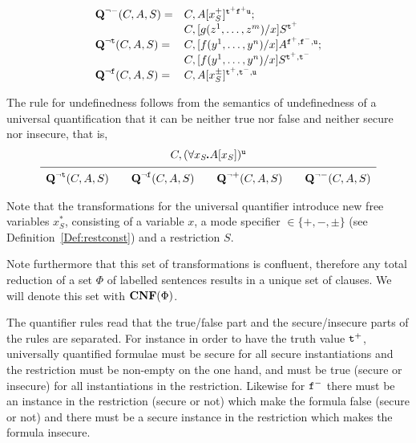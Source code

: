 \documentclass{\filespath jancl}
\def\Cnf{\hbox{\bf CNF}}               %
\def\sdot{\rule{.3ex}{.3ex}\hspace{-0.4ex}\;}
\newcommand{\true}{{\tt t}}
\newcommand{\false}{{\tt f}}
\newcommand{\twts}{{{\tt t}^+}}
\newcommand{\twfs}{{{\tt f}^+}}
\newcommand{\twti}{{{\tt t}^-}}
\newcommand{\twfi}{{{\tt f}^-}}
\newcommand{\twu}{{\tt u}}
\begin{document}
\begin{definition}
\[\begin{array}{ll}
\Q^{\non -}(C,A,S) = & C, A[x_S^+]^{\twts\twfs\twu};\\
                   & C, [g(z^1,\ldots,z^m)/x]S^\twts\\

\Q^{\non\true}(C,A,S) = & C, [f(y^1,\ldots,y^n)/x]A^{\twfs,\twfi,\twu};\\
                      &  C, [f(y^1,\ldots,y^n)/x]S^{\twts,\twti}\\
\Q^{\non\false}(C,A,S) = & C, A[x_S^\pm]^{\twts,\twti,\twu}\\

\end{array}
\]

The rule for undefinedness follows from the semantics of undefinedness
of a universal quantification that it can be neither true nor false
and neither secure nor insecure, that is,
\[
 \begin{array}{c}
 C,(\forall x_S\sdot A[x_S])^\twu\\[1ex]\hline
     \rule{0ex}{3ex}\Q^{\non\true}(C,A,S)\qquad\Q^{\non\false}(C,A,S)\qquad
       \Q^{\non+}(C,A,S)\qquad\Q^{\non-}(C,A,S)
  \end{array}\]
\end{definition}

Note that the transformations for the universal quantifier introduce new free
variables $x^*_S$, consisting of a variable $x$, a mode specifier $\in\{+,-,\pm\}$
(see Definition~\ref{Def:restconst}) and a restriction $S$.

Note furthermore that this set of transformations is confluent,
therefore any total reduction of a set $\Phi$ of labelled sentences
results in a unique set of clauses. We will denote this set with
$\Cnf(\Phi)$.

The quantifier rules read that the true/false part and the
secure/insecure parts of the rules are separated. For instance in
order to have the truth value $\twts$, universally quantified formulae
must be secure for all secure instantiations and the restriction must
be non-empty on the one hand, and must be true (secure or insecure)
for all instantiations in the restriction. Likewise for $\twfi$ there
must be an instance in the restriction (secure or not) which make the
formula false (secure or not) and there must be a secure instance in
the restriction which makes the formula insecure.
\end{document}
